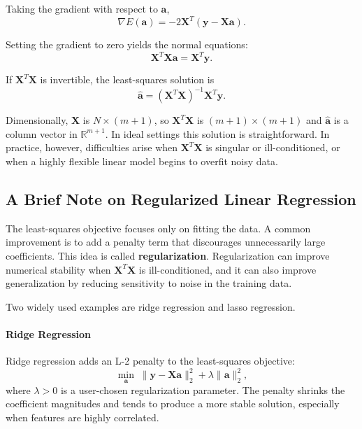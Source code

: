 \documentclass[12pt]{article}
\begin{document}
Taking the gradient with respect to $\mathbf{a}$,
\begin{equation}
\nabla E(\mathbf{a}) = -2\mathbf{X}^T(\mathbf{y} - \mathbf{X}\mathbf{a}).
\end{equation}

Setting the gradient to zero yields the normal equations:
\begin{equation}
\mathbf{X}^T\mathbf{X}\mathbf{a} = \mathbf{X}^T\mathbf{y}.
\end{equation}

If $\mathbf{X}^T\mathbf{X}$ is invertible, the least-squares solution is
\begin{equation}
\hat{\mathbf{a}} = (\mathbf{X}^T\mathbf{X})^{-1}\mathbf{X}^T\mathbf{y}.
\end{equation}

Dimensionally, $\mathbf{X}$ is $N \times (m+1)$, so $\mathbf{X}^T\mathbf{X}$ is $(m+1) \times (m+1)$ and $\hat{\mathbf{a}}$ is a column vector in $\mathbb{R}^{m+1}$. In ideal settings this solution is straightforward. In practice, however, difficulties arise when $\mathbf{X}^T\mathbf{X}$ is singular or ill-conditioned, or when a highly flexible linear model begins to overfit noisy data.

\subsection{A Brief Note on Regularized Linear Regression}

The least-squares objective focuses only on fitting the data. A common improvement is to add a penalty term that discourages unnecessarily large coefficients. This idea is called \textbf{regularization}. Regularization can improve numerical stability when $\mathbf{X}^T\mathbf{X}$ is ill-conditioned, and it can also improve generalization by reducing sensitivity to noise in the training data.

Two widely used examples are ridge regression and lasso regression.

\paragraph{Ridge Regression}
Ridge regression adds an L-2 penalty to the least-squares objective:
\begin{equation}
\min_{\mathbf{a}} \; \|\mathbf{y} - \mathbf{X}\mathbf{a}\|_2^2 + \lambda \|\mathbf{a}\|_2^2,
\end{equation}
where $\lambda > 0$ is a user-chosen regularization parameter. The penalty shrinks the coefficient magnitudes and tends to produce a more stable solution, especially when features are highly correlated.
\end{document}
